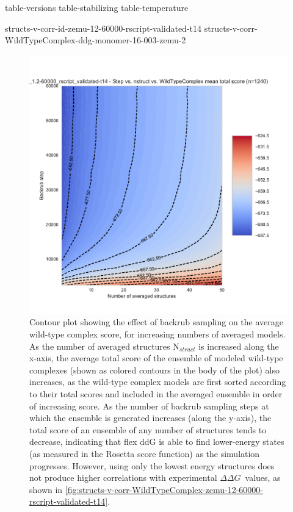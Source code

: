 \documentclass{article}
\newcommand\ddg{$\Delta\Delta G$}
\begin{document}
\renewcommand{\thefigure}{S\arabic{figure}}
\setcounter{figure}{0}
\renewcommand{\thetable}{S\arabic{table}}
\setcounter{table}{0}

{table-versions}
{table-stabilizing}
{table-temperature}

\clearpage

\clearpage

{structs-v-corr-id-zemu-12-60000-rscript-validated-t14}
{structs-v-corr-WildTypeComplex-ddg-monomer-16-003-zemu-2}

\begin{figure}
  \centering
  \includegraphics[width=\textwidth,keepaspectratio]{figures/wildtypecomplex-scores-complete.pdf}
  \caption{
    Contour plot showing the effect of backrub sampling on the average wild-type complex score, for increasing numbers of averaged models. As the number of averaged structures N$_{struct}$ is increased along the x-axis, the average total score of the ensemble of modeled wild-type complexes (shown as colored contours in the body of the plot) also increases, as the wild-type complex models are first sorted according to their total scores and included in the averaged ensemble in order of increasing score.
    As the number of backrub sampling steps at which the ensemble is generated increases (along the y-axis), the total score of an ensemble of any number of structures tends to decrease, indicating that flex ddG is able to find lower-energy states (as measured in the Rosetta score function) as the simulation progresses. However, using only the lowest energy structures does not produce higher correlations with experimental \ddg\ values, as shown in \cref{fig:structs-v-corr-WildTypeComplex-zemu-12-60000-rscript-validated-t14}.
  } \label{fig:wildtypecomplex-scores-complete}
\end{figure}
\end{document}
